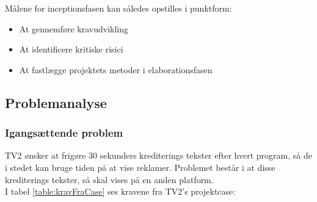 \noindent
Målene for inceptionsfasen kan således opstilles i punktform:
\begin{itemize}
    \item At gennemføre kravudvikling
    \item At identificere kritiske risici
    \item At fastlægge projektets metoder i elaborationsfasen
\end{itemize}

\subsection{Problemanalyse}

\subsubsection{Igangsættende problem}
TV2 ønsker at frigøre 30 sekunders krediterings tekster efter hvert program, så de i stedet kan bruge tiden på at vise reklamer. Problemet består i at disse krediterings tekster, så skal vises på en anden platform.\\

\noindent
I tabel \ref{table:kravFraCase} ses kravene fra TV2's projektcase:

